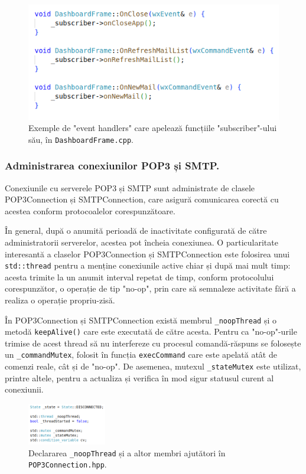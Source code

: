 \documentclass[runningheads]{llncs}
\begin{document}
\begin{figure}
    \centering
    \includegraphics[width=\textwidth]{subscriberFxns.png}
    \caption{Exemple de "event handlers" care apelează funcțiile "subscriber"-ului său, în \texttt{DashboardFrame.cpp}.}
    \label{fig:subscriberFxns}
\end{figure}

\subsubsection{Administrarea conexiunilor POP3 și SMTP.}

Conexiunile cu serverele POP3 și SMTP sunt administrate de clasele POP3Connection și SMTPConnection, care asigură comunicarea corectă cu acestea conform protocoalelor corespunzătoare. 

În general, după o anumită perioadă de inactivitate configurată de către administratorii serverelor, acestea pot încheia conexiunea. O particularitate interesantă a claselor POP3Connection și SMTPConnection este folosirea unui \texttt{std::thread} pentru a menține conexiunile active chiar și după mai mult timp: acesta trimite la un anumit interval repetat de timp, conform protocolului corespunzător, o operație de tip "no-op", prin care să semnaleze activitate fără a realiza o operație propriu-zisă.

În POP3Connection și SMTPConnection există membrul \texttt{\_noopThread} și o metodă \texttt{keepAlive()} care este executată de către acesta. Pentru ca "no-op"-urile trimise de acest thread să nu interfereze cu procesul comandă-răspuns se folosește un \texttt{\_commandMutex}, folosit în funcția \texttt{execCommand} care este apelată atât de comenzi reale, cât și de "no-op". De asemenea, mutexul \texttt{\_stateMutex} este utilizat, printre altele, pentru a actualiza și verifica în mod sigur statusul curent al conexiunii.

\begin{figure}
    \centering
    \includegraphics[width={130px}]{noopThread.png}
    \caption{Declararea \texttt{\_noopThread} și a altor membri ajutători în \texttt{POP3Connection.hpp}.}
    \label{fig:noopThread}
\end{figure}
\end{document}
